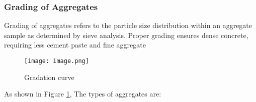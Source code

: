 \documentclass[a4paper,11pt]{book}
\begin{document}
 \subsubsection{Grading of Aggregates}
 
Grading of aggregates refers to the particle size distribution within an aggregate sample as determined by sieve analysis. Proper grading ensures dense concrete, requiring less cement paste and fine aggregate

\begin{figure}[h]
    \centering
    \texttt{[image: image.png]} %
    \caption{Gradation curve}
    \label{fig:example}
\end{figure}

\noindent As shown in Figure \ref{fig:example},  The types of aggregates are:
\end{document}
